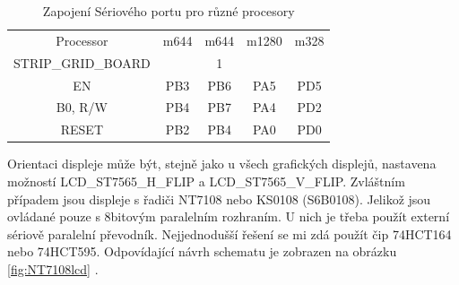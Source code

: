 \begin{table}[H]
  \begin{center}
    \begin{tabular}{| c || c | c | c | c |}
    \hline
 Processor  & m644  & m644 & m1280  & m328 \\
STRIP\_GRID\_BOARD &       &   1   &        &     \\
    \hline
    \hline
  EN        &  PB3  & PB6   &  PA5   & PD5     \\
    \hline
  B0, R/W   &  PB4  & PB7   &  PA4   & PD2      \\
    \hline
  RESET     &  PB2  & PB4   &  PA0   & PD0      \\
    \hline
    \end{tabular}
  \end{center}
  \caption{Zapojení Sériového portu pro různé procesory}
  \label{tab:ser-processor}
\end{table}

Orientaci displeje může být, stejně jako u všech grafických displejů, nastavena
možností LCD\_\discretionary{}{}{}ST7565\_\discretionary{}{}{}H\_FLIP a LCD\_\discretionary{}{}{}ST7565\_\discretionary{}{}{}V\_FLIP.
Zvláštním případem jsou displeje s řadiči NT7108 nebo KS0108 (S6B0108). Jelikož jsou ovládané
pouze s 8bitovým paralelním rozhraním. U nich je třeba použít externí sériově paralelní převodník.
Nejjednodušší řešení se mi zdá použít čip 74HCT164 nebo 74HCT595.
Odpovídající návrh schematu je zobrazen na obrázku \ref{fig:NT7108lcd} .

